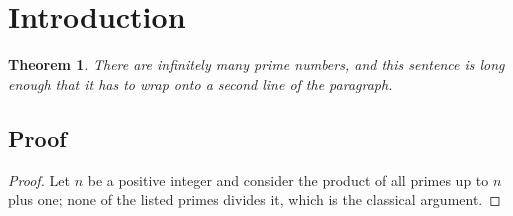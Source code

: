 \documentclass[11pt]{article}
\newtheorem{theorem}{Theorem}
\begin{document}
\section{Introduction}
\begin{theorem}
There are infinitely many prime numbers, and this sentence is long enough that it has to wrap onto a second line of the paragraph.
\end{theorem}
\subsection{Proof}
\begin{proof}
Let $n$ be a positive integer and consider the product of all primes up to $n$ plus one; none of the listed primes divides it, which is the classical argument.
\end{proof}
\end{document}
